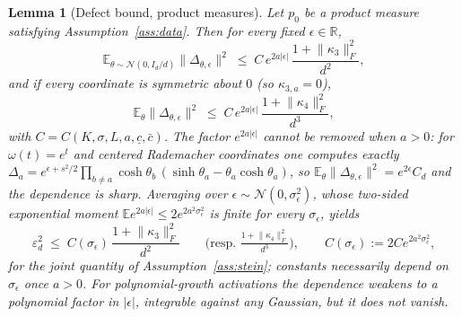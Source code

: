 \documentclass[11pt]{article}
\newtheorem{lemma}{Lemma}
\theoremstyle{remark}
\newcommand{\E}{\mathbb{E}}
\newcommand{\R}{\mathbb{R}}
\newcommand{\Fro}[1]{\lVert #1 \rVert_F}
\begin{document}
\begin{lemma}[Defect bound, product measures]\label{lem:defect}
Let $p_0$ be a product measure satisfying Assumption~\ref{ass:data}. Then for every fixed $\epsilon \in \R$,
\[
\E_{\theta\sim\mathcal N(0, I_d/d)}\lVert\Delta_{\theta,\epsilon}\rVert^2 \;\le\; C\,e^{2a|\epsilon|}\,\frac{1 + \Fro{\kappa_3}^2}{d^{2}},
\]
and if every coordinate is symmetric about $0$ (so $\kappa_{3,a} = 0$),
\[
\E_{\theta}\lVert\Delta_{\theta,\epsilon}\rVert^2 \;\le\; C\,e^{2a|\epsilon|}\,\frac{1+\Fro{\kappa_4}^2}{d^3},
\]
with $C = C(K, \sigma, L, a, \underline c, \bar c)$. The factor $e^{2a|\epsilon|}$ \emph{cannot} be removed when $a > 0$: for $\omega(t) = e^t$ and centered Rademacher coordinates one computes exactly $\Delta_a = e^{\epsilon + s^2/2}\prod_{b\ne a}\cosh\theta_b\,(\sinh\theta_a - \theta_a\cosh\theta_a)$, so $\E_\theta\lVert\Delta_{\theta,\epsilon}\rVert^2 = e^{2\epsilon}C_d$ and the dependence is sharp. Averaging over $\epsilon \sim \mathcal N(0,\sigma_\epsilon^2)$, whose two-sided exponential moment $\E e^{2a|\epsilon|} \le 2e^{2a^2\sigma_\epsilon^2}$ is finite for every $\sigma_\epsilon$, yields
\[
\varepsilon_d^2 \;\le\; C(\sigma_\epsilon)\,\frac{1+\Fro{\kappa_3}^2}{d^2}
\qquad\text{(resp.\ } \tfrac{1+\Fro{\kappa_4}^2}{d^3}\text{)},
\qquad C(\sigma_\epsilon) := 2Ce^{2a^2\sigma_\epsilon^2},
\]
for the joint quantity of Assumption~\ref{ass:stein}; constants necessarily depend on $\sigma_\epsilon$ once $a > 0$. For polynomial-growth activations the dependence weakens to a polynomial factor in $|\epsilon|$, integrable against any Gaussian, but it does not vanish.
\end{lemma}
\end{document}
